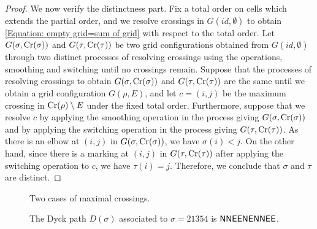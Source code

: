 \begin{proof}
  We now verify the distinctness part.
  Fix a total order on cells which extends the partial order,
  and we resolve crossings in \( G(id, \emptyset) \) to obtain
  \eqref{Equation: empty grid=sum of grid} with respect to the total order.
  Let $G(\sigma,\operatorname{Cr}(\sigma))$ and $G(\tau,\operatorname{Cr}(\tau))$ be two grid configurations
  obtained from $G(id,\emptyset)$ through two distinct processes of resolving
  crossings using the operations, smoothing and switching until no crossings
  remain. Suppose that the processes of resolving crossings to obtain
  $G(\sigma,\operatorname{Cr}(\sigma))$ and $G(\tau,\operatorname{Cr}(\tau))$ are the same until we obtain
  a grid configuration $G(\rho,E)$, and let $c=(i,j)$ be the maximum crossing in
  $\operatorname{Cr}(\rho)\setminus E$ under the fixed total order.
  Furthermore, suppose that we resolve $c$ by applying the smoothing operation in the process giving
  $G(\sigma,\operatorname{Cr}(\sigma))$ and by applying the switching operation in the process giving
  $G(\tau,\operatorname{Cr}(\tau))$. As there is an elbow at $(i,j)$ in \( G(\sigma,\operatorname{Cr}(\sigma))
  \), we have $\sigma(i)<j$. On the other hand, since there is a marking at
  $(i,j)$ in \( G(\tau,\operatorname{Cr}(\tau)) \) after applying the switching operation to $c$, we have
  $\tau(i)=j$. Therefore, we conclude that $\sigma$ and $\tau$ are distinct.
\end{proof}



\begin{figure}
  \centering
  
  \caption{Two cases of maximal crossings.}
  \label{Fig: two cases of maximal crossings}
  \end{figure}

\begin{figure}
  \centering
  \caption{The Dyck path \( D(\sigma) \) associated to \( \sigma=21354 \) is
  \( \mathsf{N}\mathsf{N}\mathsf{E}\mathsf{E}\mathsf{N}\mathsf{E}\mathsf{N}\mathsf{N}\mathsf{E}\mathsf{E} \).}
  \label{fig:D_sigma}
\end{figure}

